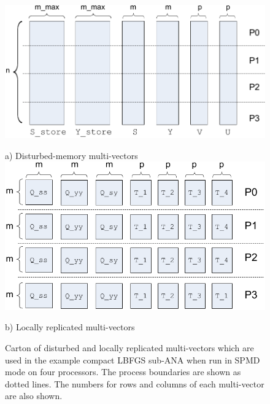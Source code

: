 \documentclass[pdf,ps2pdf,11pt]{SANDreport}
\begin{document}
{\bsinglespace
\begin{figure}
\begin{center}

\includegraphics*[angle=0,scale=0.60]{figures/SPMD_Dist_MVs_P4}

a) Disturbed-memory multi-vectors \\[3ex]

\includegraphics*[angle=0,scale=0.60]{figures/SPMD_Locally_Replicated_MVs_P4}

b) Locally replicated multi-vectors

\end{center}
\caption{
\label{tsfcore:fig:SPMD_MVs_P4}
Carton of disturbed and locally replicated multi-vectors which are
used in the example compact LBFGS sub-ANA when run in SPMD mode on
four processors.  The process boundaries are shown as dotted lines.
The numbers for rows and columns of each multi-vector are also shown.}
\end{figure}
\esinglespace}
\end{document}

